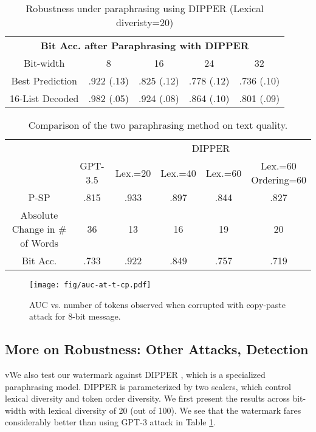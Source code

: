 \begin{table}[t]
    \centering
    \begin{tabular}{c|cccc}
        \toprule
        \multicolumn{5}{c}{\textbf{Bit Acc. after Paraphrasing with DIPPER}} \\ 
        \multicolumn{1}{c}{Bit-width}  & 8 & 16 & 24 & 32 \\ \hline
        Best Prediction   &  .922 (.13) & .825 (.12) & .778 (.12) & .736 (.10) \\
        16-List Decoded   &  .982 (.05) & .924 (.08) & .864 (.10) & .801 (.09) \\
        \bottomrule
    \end{tabular}
    \caption{Robustness under paraphrasing using DIPPER (Lexical diveristy=20)}  \label{tab:dipper}
\end{table}

\begin{table}[t]
    \centering
    \begin{tabular}{c|c|cccc}
        \toprule
        &  & \multicolumn{4}{c}{DIPPER} \\
        & GPT-3.5 & Lex.=20 & Lex.=40 & Lex.=60 & \makecell{Lex.=60\\Ordering=60} \\
        \toprule
        P-SP  &  .815	&.933	&.897	& .844	&.827 \\
        \small Absolute Change in $\#$ of Words  & 36 & 13 & 16 & 19 & 20\\
        Bit Acc. & .733 &	.922 &	.849 &	.757 &	.719 \\
        \bottomrule
    \end{tabular}
    \caption{Comparison of the two paraphrasing method on text quality.}  \label{tab:dipper-semantic}
\end{table}



\begin{figure}
    \centering
    \texttt{[image: fig/auc-at-t-cp.pdf]}
    \caption{AUC vs. number of tokens observed when corrupted with copy-paste attack for 8-bit message.}
    \label{fig:auc-at-t-cp}
\end{figure}


\subsection{More on Robustness: Other Attacks, Detection}\label{appendix:dipper} 
vWe also test our watermark against DIPPER \citep{krishna2023paraphrasing}, which is a specialized paraphrasing model. DIPPER is parameterized by two scalers, which control lexical diversity and token order diversity. We first present the results across bit-width with lexical diversity of 20 (out of 100). We see that the watermark fares considerably better than using GPT-3 attack in Table \ref{tab:dipper}.  

